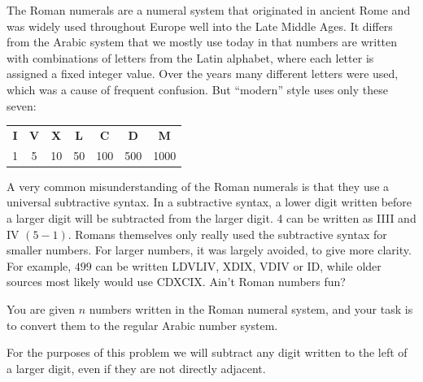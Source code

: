 


The Roman numerals are a numeral system that originated in ancient Rome and was widely used throughout Europe well into
the Late Middle Ages. It differs from the Arabic system that we mostly use today in that numbers are written with combinations
of letters from the Latin alphabet, where each letter is assigned a fixed integer value.  Over the years many different letters were used,
which was a cause of frequent confusion.  But ``modern'' style uses only these seven:

\begin{tabular}{ccccccc}
\textbf{I} & \textbf{V} & \textbf{X} & \textbf{L} & \textbf{C} & \textbf{D} & \textbf{M} \\
1 & 5 & 10 & 50 & 100 & 500 & 1000 \\
\end{tabular}

A very common misunderstanding of the Roman numerals is that they use a universal subtractive syntax. In a subtractive syntax,
a lower digit written before a larger digit will be subtracted from the larger digit. 4 can be written as IIII and IV $(5-1)$. Romans 
themselves only really used the subtractive syntax for smaller numbers. For larger numbers, it was largely avoided, to give more clarity. 
For example, $499$ can be written LDVLIV, XDIX, VDIV or ID, while older sources most
likely would use CDXCIX. Ain't Roman numbers fun?

You are given $n$ numbers written in the Roman numeral system, and your task is to convert them
to the regular Arabic number system.

For the purposes of this problem we will subtract any digit written to the left of a larger digit, even if they are not directly adjacent.

